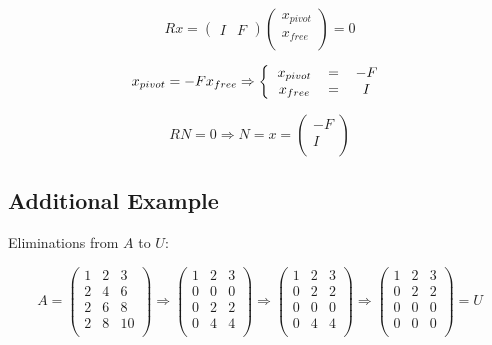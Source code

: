 \documentclass[12pt]{article}
\begin{document}
\[
Rx=
\left(
    \begin{matrix}
        I & F
    \end{matrix}
\right)
\left(
    \begin{matrix}
        x_{pivot}\\
        x_{free}\\
    \end{matrix}
\right)
=0
\]

\[
x_{pivot} = -Fx_{free}
\Rightarrow
\left \{
  \begin{tabular}{ccc}
  $x_{pivot}$ & $=$ & $-F$\\
  $x_{free}$ & $=$ & $I$\\
  \end{tabular}
\right
.
\]

\[
RN=0
\Rightarrow
N=x=
\left(
    \begin{matrix}
        -F\\
        I\\
    \end{matrix}
\right)
\]

\subsection{Additional Example}

Eliminations from $A$ to $U$:

\[
A=
\left(
    \begin{matrix}
        \boxed{1} & 2 & 3\\
        2 & 4 & 6\\
        2 & 6 & 8\\
        2 & 8 & 10\\
    \end{matrix}
\right)
\Rightarrow
\left(
    \begin{matrix}
        \boxed{1} & 2 & 3\\
        0 & \boxed{0} & 0\\
        0 & 2 & 2\\
        0 & 4 & 4\\
    \end{matrix}
\right)
\Rightarrow
\left(
    \begin{matrix}
        \boxed{1} & 2 & 3\\
        0 & \boxed{2} & 2\\
        0 & 0 & 0\\
        0 & 4 & 4\\
    \end{matrix}
\right)
\Rightarrow
\left(
    \begin{matrix}
        \boxed{1} & 2 & 3\\
        0 & \boxed{2} & 2\\
        0 & 0 & 0\\
        0 & 0 & 0\\
    \end{matrix}
\right)
=U
\]
\end{document}
